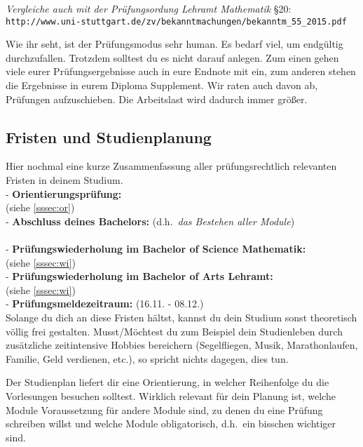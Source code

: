 {\it Vergleiche auch mit der Prüfungsordung Lehramt Mathematik} §20:\\
{\small
\verb|http://www.uni-stuttgart.de/zv/bekanntmachungen/bekanntm_55_2015.pdf|}

Wie ihr seht, ist der Prüfungsmodus sehr human.
Es bedarf viel, um endgültig durchzufallen.
Trotzdem solltest du es nicht darauf anlegen.
Zum einen gehen viele eurer Prüfungsergebnisse
auch in eure Endnote mit ein,
zum anderen stehen die Ergebnisse
in eurem \glqq Diploma Supplement\grqq.
Wir raten auch davon ab, Prüfungen aufzuschieben.
Die Arbeitslast wird dadurch immer größer.

\subsection{Fristen und Studienplanung}\label{ssec:fp}

Hier nochmal eine kurze Zusammenfassung
aller prüfungsrechtlich relevanten Fristen
in deinem Studium.\\[6pt]
- {\bf Orientierungsprüfung:}\\
\hspace{1cm}{\it Bis spätestens zum Beginn des 4.~Semesters} (siehe \ref{sssec:or})\\[3pt]
- {\bf Abschluss deines Bachelors:} (d.h.\ {\it das Bestehen aller Module})\\
\hspace{1cm}{\it Bis spätestens zum Ende des 10.~Semesters}\\[3pt]
- {\bf Prüfungswiederholung im Bachelor of Science Mathematik:}\\
\hspace{1cm}{\it Spätestens beim übernächsten möglichen Termin}
(siehe \ref{sssec:wi})\\[3pt]
- {\bf Prüfungswiederholung im Bachelor of Arts Lehramt:}\\
\hspace{1cm}{\it Spätestens innerhalb von zwei Semestern}
(siehe \ref{sssec:wi})\\[3pt]
- {\bf Prüfungsmeldezeitraum:} (16.11. - 08.12.)\\[6pt]
Solange du dich an diese Fristen hältst,
kannst du dein Studium sonst theoretisch völlig frei gestalten.
Musst/Möchtest du zum Beispiel dein Studienleben
durch zusätzliche zeitintensive Hobbies bereichern
(Segelfliegen, Musik, Marathonlaufen, Familie, Geld verdienen, etc.),
so spricht nichts dagegen, dies tun.

Der Studienplan liefert dir eine Orientierung,
in welcher Reihenfolge du die Vorlesungen besuchen solltest.
Wirklich relevant für dein Planung ist,
welche Module Voraussetzung für andere Module sind,
zu denen du eine Prüfung schreiben willst
und welche Module obligatorisch,
d.h.\ ein bisschen wichtiger sind.


